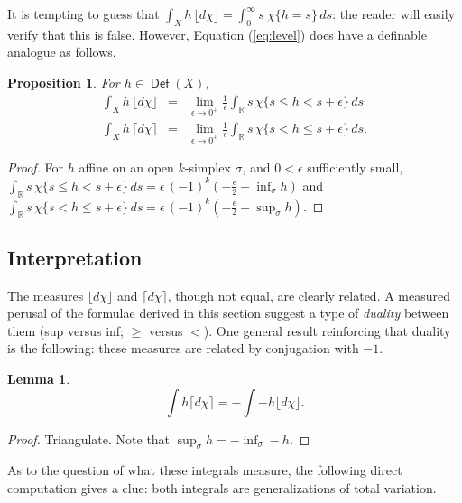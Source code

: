 \documentclass{psapm-l}
\newtheorem{lemma}[theorem]{Lemma}
\newtheorem{proposition}[theorem]{Proposition}
\theoremstyle{definition}
\theoremstyle{remark}
\numberwithin{equation}{section}
\begin{document}
It is tempting to guess that $\int_Xh\,{{\lfloor d\chi\rfloor}}=\int_0^\infty s\ \chi\{h=s\}\,ds$: the reader will easily verify that this is false. However, Equation (\ref{eq:level}) does have a definable analogue as follows.
\begin{proposition}
\label{prop:r-valued2}
For $h\in {{{\operatorname{\mathsf{{Def}}}}}}(X)$,
\begin{eqnarray}
\label{eq:r-valued2}
    \int_X h\,{{\lfloor d\chi\rfloor}}
    &=&
    \lim_{\epsilon\to 0^+}\frac{1}{\epsilon}\int_{{\mathbb R}}
    s\,\chi\{s\leq h<s+\epsilon\}\,ds
\\
    \int_X h\,{{\lceil d\chi\rceil}}
    &=&
    \lim_{\epsilon\to 0^+}\frac{1}{\epsilon}\int_{{\mathbb R}}
    s\,\chi\{s< h\leq s+\epsilon\}\,ds .
\end{eqnarray}
\end{proposition}
\begin{proof}
For $h$ affine on an open $k$-simplex $\sigma$, and $0<\epsilon$ sufficiently small, $\int_{{\mathbb R}} s\,\chi\{s\leq
h<s+\epsilon\}\,ds = \epsilon\,(-1)^k\left(-\frac{\epsilon}{2}+\inf_{\sigma} h\right)$ and $\int_{{\mathbb R}} s\,\chi\{s< h \leq s+\epsilon\}\,ds =
\epsilon\,(-1)^k\left(-\frac{\epsilon}{2}+\sup_{\sigma} h\right)$.
\end{proof}

\subsection{Interpretation}
\label{sec:interpret}

The measures ${{\lfloor d\chi\rfloor}}$ and ${{\lceil d\chi\rceil}}$, though not equal, are clearly related. A measured perusal of the formulae derived in this section suggest a type of {\em duality} between them (sup versus inf; $\geq$ versus $<$). One general result reinforcing that duality is the following: these measures are related by conjugation with $-1$.
\begin{lemma}
\label{lem:floortoceiling}
\begin{equation}
\label{eq:floortoceiling}
    \int h{{\lceil d\chi\rceil}} = -\int -h{{\lfloor d\chi\rfloor}} .
\end{equation}
\end{lemma}
\begin{proof}
Triangulate. Note that $\sup_\sigma h=-\inf_\sigma -h$.
\end{proof}

As to the question of what these integrals measure, the following direct computation gives a clue: both integrals are generalizations of total variation.
\end{document}
